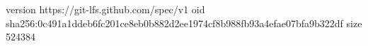 version https://git-lfs.github.com/spec/v1
oid sha256:0c491a1ddeb6fc201ce8eb0b882d2ee1974cf8b988fb93a4efae07bfa9b322df
size 524384

